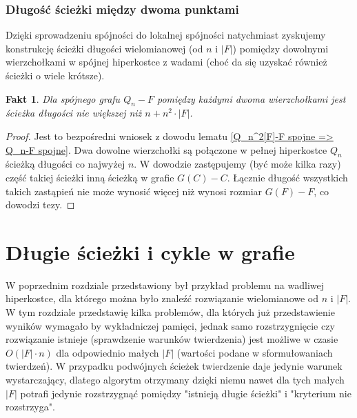 \documentclass{pracamgr}
\newtheorem{fact}[theorem]{Fakt}
\begin{document}
   \subsection{Długość ścieżki między dwoma punktami}
    Dzięki sprowadzeniu spójności do lokalnej spójności natychmiast zyskujemy konstrukcję ścieżki długości wielomianowej (od $n$ i $|F|$) pomiędzy dowolnymi
    wierzchołkami w spójnej hiperkostce z wadami (choć da się uzyskać również ścieżki o wiele krótsze).
    \begin{fact}
     Dla spójnego grafu $Q_n-F$ pomiędzy każdymi dwoma wierzchołkami jest ścieżka długości nie większej niż $n+n^2\cdot|F|$.
    \end{fact}
    \begin{proof}
     Jest to bezpośredni wniosek z dowodu lematu \ref{Q_n^2[F]-F spojne => Q_n-F spojne}. Dwa dowolne wierzchołki są połączone w pełnej hiperkostce $Q_n$
     ścieżką długości co najwyżej $n$. W dowodzie zastępujemy (być może kilka razy)
     część takiej ścieżki inną ścieżką w grafie $G(C)-C$. Łącznie długość wszystkich takich zastąpień nie może wynosić więcej niż wynosi rozmiar $G(F)-F$,
     co dowodzi tezy.
    \end{proof}

 \chapter{Długie ścieżki i cykle w grafie}
  W poprzednim rozdziale przedstawiony był przykład problemu na wadliwej hiperkostce, dla którego można było znaleźć rozwiązanie wielomianowe od $n$ i $|F|$.
  W tym rozdziale przedstawię kilka problemów, dla których już przedstawienie wyników wymagało by wykładniczej pamięci,
  jednak samo rozstrzygnięcie czy rozwiązanie istnieje (sprawdzenie warunków twierdzenia) jest możliwe w czasie
  $O(|F|\cdot n)$ dla odpowiednio małych $|F|$ (wartości podane w sformułowaniach twierdzeń).
  W przypadku podwójnych ścieżek twierdzenie daje jedynie warunek wystarczający, dlatego algorytm otrzymany dzięki niemu nawet dla tych małych $|F|$ potrafi
  jedynie rozstrzygnąć pomiędzy "istnieją długie ścieżki" i "kryterium nie rozstrzyga".
\end{document}
